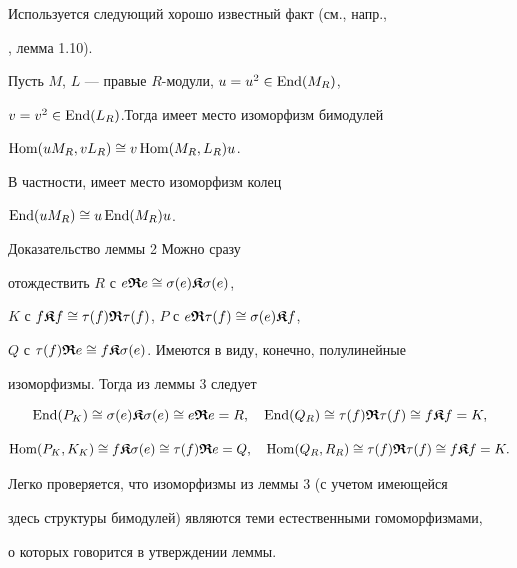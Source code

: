 Используется следующий хорошо известный факт (см., напр.,


\cite{Mih}, лемма 1.10).





\begin{lem}


Пусть $M$, $L$ --- правые $R$-модули, $u=u^2 \in \operatorname{End}(M_R)$,


$v=v^2 \in \operatorname{End}(L_R)$.Тогда имеет место изоморфизм бимодулей 


$\operatorname{Hom}(uM_R,vL_R) \cong v \operatorname{Hom}(M_R,L_R) u$.


В частности, имеет место изоморфизм колец


$ \operatorname{End}(uM_R) \cong u \operatorname{End}(M_R) u$.


\end{lem}





\begin{pf*}{Доказательство леммы 2} Можно сразу


отождествить $R$ с $e \boldsymbol{\frak R} e\cong \sigma(e)\boldsymbol{\frak K} \sigma(e)$,


$K$ с $f \boldsymbol{\frak K} f\cong \tau(f) \boldsymbol{\frak R} \tau(f)$, $P$ с $e\boldsymbol{\frak R} \tau(f) \cong \sigma(e) \boldsymbol{\frak K} f$,


$Q$ с $\tau(f) \boldsymbol{\frak R} e \cong f\boldsymbol{\frak K} \sigma(e)$. Имеются в виду, конечно, полулинейные


изоморфизмы. Тогда из леммы 3 следует


$$


{\End}(P_K)\cong \s(e) \K \s(e)\cong e\R e=R,\quad


{\End}(Q_R)\cong \t(f)\R\t(f) \cong f\K f=K,


$$


$$


{\Hom}(P_K,K_K)\cong f\K \s(e)\cong\t(f)\R e=Q,\quad


{\Hom}(Q_R,R_R)\cong \t(f)\R\t(f)\cong f\K f=K.


$$





Легко проверяется, что изоморфизмы из леммы 3 (с учетом имеющейся


здесь структуры бимодулей) являются теми естественными гомоморфизмами,


о которых говорится в утверждении леммы.


\end{pf*}





